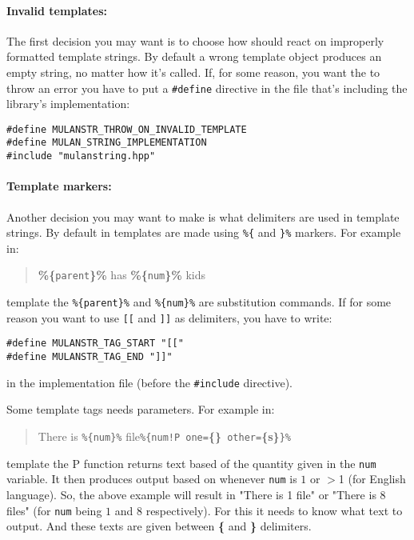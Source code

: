 \paragraph{Invalid templates:} The first decision you may want is to choose how \mulan{} should react on improperly formatted template strings.
By default a wrong template object produces an empty string, no matter how it's called. If, for some reason, you want the \mulan{} to throw an error
you have to put a \verb+#define+ directive in the file that's including the library's implementation:
\begin{verbatim}
#define MULANSTR_THROW_ON_INVALID_TEMPLATE
#define MULAN_STRING_IMPLEMENTATION
#include "mulanstring.hpp"
\end{verbatim}

\paragraph{Template markers:}Another decision you may want to make is what delimiters are used in template strings. 
By default in \mulan{} templates are made using \verb+%{+ and \verb+}%+ markers. For example in:
\begin{quotation}
	\textbf{\%\{}\texttt{parent}\textbf{\}\%} has \textbf{\%\{}\texttt{num}\textbf{\}\%} kids
\end{quotation}
template the \verb+%{parent}%+ and \verb+%{num}%+ are substitution commands. 
If for some reason you want to use \verb+[[+ and \verb+]]+ as delimiters, you have to write:
\begin{verbatim}
#define MULANSTR_TAG_START "[["
#define MULANSTR_TAG_END "]]"
\end{verbatim} in the implementation file (before the \verb+#include+ directive).

Some template tags needs parameters. For example in:
\begin{quotation}
	There is \verb+%{num}%+ file\verb+%{num!P one=+\textbf{\{\}}\verb+ other=+\textbf{\{s\}}\verb+}%+
\end{quotation}
template the \textsc{P} function returns text based of the quantity given in the \texttt{num} variable. 
It then produces output based on whenever \texttt{num} is $1$ or $>$1 (for English language).
So, the above example will result in "There is 1 file" or "There is 8 files" (for \texttt{num} being $1$ and $8$ respectively).
For this it needs to know what text to output. And these texts are given between \textbf{\{} and \textbf{\}} delimiters.

